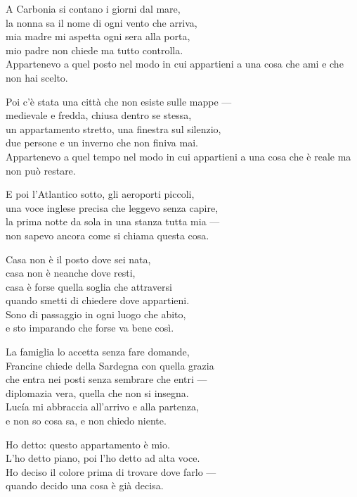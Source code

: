\begin{lyrics}

A Carbonia si contano i giorni dal mare,\\
la nonna sa il nome di ogni vento che arriva,\\
mia madre mi aspetta ogni sera alla porta,\\
mio padre non chiede ma tutto controlla.\\
Appartenevo a quel posto nel modo in cui appartieni a una cosa che ami e che non hai scelto.

Poi c'è stata una città che non esiste sulle mappe —\\
medievale e fredda, chiusa dentro se stessa,\\
un appartamento stretto, una finestra sul silenzio,\\
due persone e un inverno che non finiva mai.\\
Appartenevo a quel tempo nel modo in cui appartieni a una cosa che è reale ma non può restare.

E poi l'Atlantico sotto, gli aeroporti piccoli,\\
una voce inglese precisa che leggevo senza capire,\\
la prima notte da sola in una stanza tutta mia —\\
non sapevo ancora come si chiama questa cosa.

Casa non è il posto dove sei nata,\\
casa non è neanche dove resti,\\
casa è forse quella soglia che attraversi\\
quando smetti di chiedere dove appartieni.\\
Sono di passaggio in ogni luogo che abito,\\
e sto imparando che forse va bene così.

La famiglia lo accetta senza fare domande,\\
Francine chiede della Sardegna con quella grazia\\
che entra nei posti senza sembrare che entri —\\
diplomazia vera, quella che non si insegna.\\
Lucía mi abbraccia all'arrivo e alla partenza,\\
e non so cosa sa, e non chiedo niente.

Ho detto: questo appartamento è mio.\\
L'ho detto piano, poi l'ho detto ad alta voce.\\
Ho deciso il colore prima di trovare dove farlo —\\
quando decido una cosa è già decisa.


\end{lyrics}
